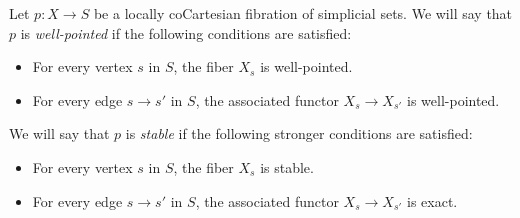 \begin{definition}
Let $p: X \rightarrow S$ be a locally coCartesian fibration of simplicial sets.
We will say that $p$ is {\it well-pointed} if the following conditions are satisfied:
\begin{itemize}
\item[$(i)$] For every vertex $s$ in $S$, the fiber $X_{s}$ is well-pointed.
\item[$(ii)$] For every edge $s \rightarrow s'$ in $S$, the associated functor
$X_{s} \rightarrow X_{s'}$ is well-pointed.
\end{itemize}
We will say that $p$ is {\it stable} if the following stronger conditions are satisfied:
\begin{itemize}
\item[$(i')$] For every vertex $s$ in $S$, the fiber $X_{s}$ is stable.
\item[$(ii')$] For every edge $s \rightarrow s'$ in $S$, the associated functor
$X_{s} \rightarrow X_{s'}$ is exact.
\end{itemize}
\end{definition}

